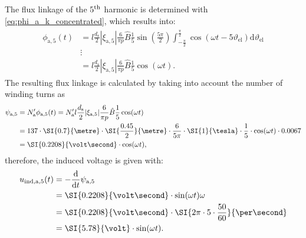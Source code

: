 \begin{solutionblock}
    The flux linkage of the $5\textsuperscript{th}$ harmonic is determined with \eqref{eq:phi_a_k_concentrated}, which results into:
    \begin{align}
        \begin{split}
            \phi_{\mathrm{a,}5}(t) & = l \frac{d_{\mathrm{s}}}{2} |\xi_{\mathrm{a},5}|
            \frac{6}{\pi p} \hat{B}\frac{1}{5} \sin\left(\frac{5\pi}{2}\right) \int_{-\frac{\pi}{2}}^{\frac{\pi}{2}} \cos(\omega t - 5\vartheta_{\mathrm{el}}) \mathrm{d}\vartheta_{\mathrm{el}} \\
                                   & \vdots                                                                                                                                                      \\
                                   & = l \frac{d_{\mathrm{s}}}{2} |\xi_{\mathrm{a},5}|
            \frac{6}{\pi p} \hat{B} \frac{1}{5} \cos(\omega t).
        \end{split}
    \end{align}
    The resulting flux linkage is calculated by taking into account the number of winding turns as
    \begin{align}
        \begin{split}
            \psi_{\mathrm{a,}5} & = N_{\mathrm{a}}' \phi_{\mathrm{a,}5}(t)
            = N_{\mathrm{a}}' l \frac{d_{\mathrm{s}}}{2} |\xi_{\mathrm{a},5}| \frac{6}{\pi p} \hat{B} \frac{1}{5} \cos(\omega t)                                                               \\
                                & = 137 \cdot \SI{0.7}{\metre} \cdot \SI{\frac{0.45}{2}}{\metre} \cdot \frac{6}{5\pi} \cdot \SI{1}{\tesla} \cdot \frac{1}{5} \cdot \cos(\omega t) \cdot 0.0067 \\
                                & = \SI{0.2208}{\volt\second} \cdot \cos(\omega t),
        \end{split}
    \end{align}
    therefore, the induced voltage is given with:
    \begin{align}
        \begin{split}
            u_{\mathrm{ind,a,}5}(t) & = -\frac{\mathrm{d}}{\mathrm{d}t}\psi_{\mathrm{a,}5}                               \\
                                    & = \SI{0.2208}{\volt\second} \cdot \sin(\omega t) \omega                            \\
                                    & = \SI{0.2208}{\volt\second} \cdot \SI{2\pi\cdot 5\cdot \frac{50}{60}}{\per\second} \\
                                    & = \SI{5.78}{\volt} \cdot \sin(\omega t).
        \end{split}
    \end{align}



\end{solutionblock}
